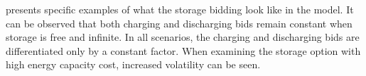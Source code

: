 \documentclass[final,3p]{elsarticle}
\begin{document}
 presents specific examples of what the storage bidding look
like in the model. It can be observed that both charging and discharging bids
remain constant when storage is free and infinite. In all scenarios, the
charging and discharging bids are differentiated only by a constant factor. When
examining the storage option with high energy capacity cost, increased
volatility can be seen.




\end{document}
